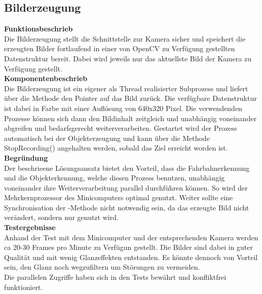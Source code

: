 \subsection{Bilderzeugung}

\textbf{Funktionsbeschrieb}\\[0.2cm]
Die Bilderzeugung stellt die Schnittstelle zur Kamera sicher und speichert die erzeugten Bilder fortlaufend in einer von OpenCV zu Verfügung gestellten Datenstruktur bereit. Dabei wird jeweils nur das aktuellste Bild der Kamera zu Verfügung gestellt.\\[0.2cm]
\textbf{Komponentenbeschrieb}\\[0.2cm]
Die Bilderzeugung ist ein eigener als Thread realisierter Subprozess und liefert über die Methode  den Pointer auf das Bild zurück. Die verfügbare Datenstruktur ist dabei  in Farbe mit einer Auflösung von 640x320 Pixel. Die verwendenden Prozesse können sich dann den Bildinhalt zeitgleich und unabhängig voneinander abgreifen und bedarfsgerecht weiterverarbeiten. Gestartet wird der Prozess automatisch bei der Objekterzeugung und kann über die Methode StopRecording() angehalten werden, sobald das Ziel erreicht worden ist.\\[0.2cm]
\textbf{Begründung}\\[0.2cm]
Der beschrieene Lösungsansatz bietet den Vorteil, dass die Fahrbahnerkennung und die Objekterkennung, welche diesen Prozess benutzen, unabhängig voneinander ihre Weiterverarbeitung parallel durchführen können. So wird der Mehrkernprozessor des Minicomputers optimal genutzt. Weiter  sollte eine Synchronisation der -Methode nicht notwendig sein, da das erzeugte Bild nicht verändert, sondern nur genutzt wird.\\[0.2cm]
\textbf{Testergebnisse}\\[0.2cm]
Anhand der Test mit dem Minicomputer und der entsprechenden Kamera werden ca 20-30 Frames pro Minute zu Verfügun gestellt. Die Bilder sind dabei in guter Qualität und mit wenig Glanzeffekten entstanden. Es könnte dennoch von Vorteil sein, den Glanz noch wegzufiltern um Störungen zu vermeiden.\\
Die parallelen Zugriffe haben sich in den Tests bewährt und konfliktfrei funktioniert.
